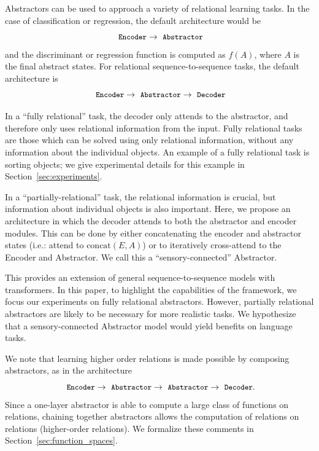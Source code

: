 Abstractors can be used to approach a variety of relational learning tasks. In the case of classification
or regression, the default architecture would be
$$\module{Encoder} \rightarrow \module{Abstractor}$$
and the discriminant or regression function is computed as $f(A)$, where $A$ is the final abstract states.
For relational sequence-to-sequence tasks, the default architecture is
$$\module{Encoder} \rightarrow \module{Abstractor} \rightarrow \module{Decoder}$$

In a ``fully relational'' task, the decoder only attends to the abstractor, and therefore only uses relational information from the input. Fully relational tasks are those which can be solved using only relational information, without any information about the individual objects. An example of a fully relational task is sorting objects; we give experimental details for this example in Section~\ref{sec:experiments}.

In a ``partially-relational'' task, the relational information is crucial, but information about individual objects is also important. Here, we propose an architecture in which the decoder attends to both the abstractor and encoder modules. This can be done by either concatenating the encoder and abstractor states (i.e.: attend to $\text{concat}(E, A)$) or to iteratively cross-attend to the Encoder and Abstractor. We call this a ``sensory-connected'' Abstractor.

This provides an extension of general sequence-to-sequence models with transformers. In this paper, to highlight the capabilities of the framework, we focus our experiments on fully relational abstractors. However, partially relational abstractors are likely to be necessary for more realistic tasks. We hypothesize that a sensory-connected Abstractor model would yield benefits on language tasks.

We note that learning higher order relations is made possible by composing
abstractors, as in the architecture
$$\module{Encoder} \rightarrow \module{Abstractor} \rightarrow \module{Abstractor} \rightarrow \module{Decoder}.$$
Since a one-layer abstractor is able to compute a large class of functions on relations, chaining together abstractors allows the computation of relations on relations (higher-order relations). We formalize these comments in Section~\ref{sec:function_spaces}.

